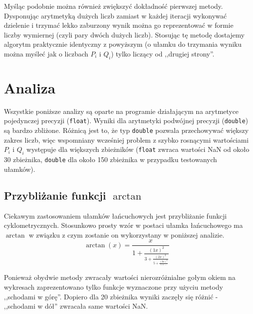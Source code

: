 \documentclass[11pt,leqno]{article}
\begin{document}
Myśląc podobnie można również zwiększyć dokładność pierwszej metody. Dysponując arytmetyką dużych liczb zamiast w każdej iteracji wykonywać dzielenie i trzymać lekko zaburzony wynik można go reprezentować w formie liczby wymiernej (czyli pary dwóch dużych liczb). Stosując tę metodę dostajemy algorytm praktycznie identyczny z powyższym (o ułamku do trzymania wyniku można myśleć jak o liczbach $P_i$ i $Q_i$) tylko liczący od ,,drugiej strony''.



\section{Analiza}
Wszystkie poniższe analizy są oparte na programie działającym na arytmetyce pojedynczej precyzji (\texttt{float}). Wyniki dla arytmetyki podwójnej precyzji (\texttt{double}) są bardzo zbliżone. Różnicą jest to, że typ \texttt{double} pozwala przechowywać większy zakres liczb, więc wspomniany wcześniej problem z szybko rosnącymi wartościami $P_i$ i $Q_i$ występuje dla większych zbieżników (\texttt{float} zwraca wartości NaN od około 30 zbieżnika, \texttt{double} dla około 150 zbieżnika w przypadku testowanych ułamków).

\subsection{Przybliżanie funkcji $\arctan$}
Ciekawym zastosowaniem ułamków łańcuchowych jest przybliżanie funkcji cyklometrycznych. Stosunkowo prosty wzór w postaci ułamka łańcuchowego ma $\arctan$ w związku z czym zostanie on wykorzystany w poniższej analizie.
\[
\arctan(x)
=
\frac{x}{\displaystyle
  1 + \frac{(1x)^2}{\displaystyle
    3 + \frac{(2x)^2}{\displaystyle
      5 + \frac{(3x)^2}{\displaystyle
        7 + \dots}
    }
  }
}
\]

Ponieważ obydwie metody zwracały wartości nierozróżnialne gołym okiem na wykresach zaprezentowano tylko funkcje wyznaczone przy użyciu metody ,,schodami w górę''. Dopiero dla 20 zbieżnika wyniki zaczęły się różnić - ,,schodami w dół'' zwracała same wartości NaN.
\end{document}
